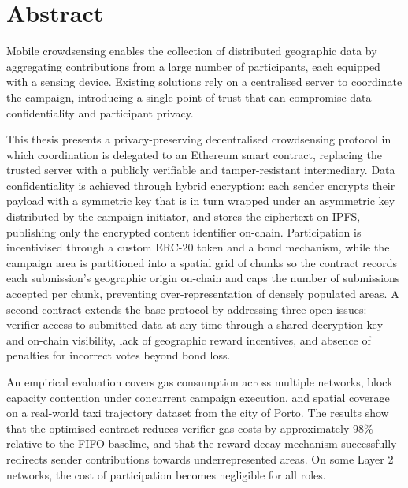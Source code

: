 \chapter*{Abstract}
Mobile crowdsensing enables the collection of distributed geographic data
by aggregating contributions from a large number of participants, each
equipped with a sensing device.
Existing solutions rely on a centralised server to coordinate the campaign,
introducing a single point of trust that can compromise data confidentiality
and participant privacy.

This thesis presents a privacy-preserving decentralised crowdsensing protocol
in which coordination is delegated to an Ethereum smart contract, replacing
the trusted server with a publicly verifiable and tamper-resistant intermediary.
Data confidentiality is achieved through hybrid encryption: each sender
encrypts their payload with a symmetric key that is in turn wrapped under an asymmetric key distributed by the campaign initiator,
and stores the ciphertext on IPFS, publishing only the encrypted
content identifier on-chain.
Participation is incentivised through a custom ERC-20 token and a bond
mechanism, while the campaign area is partitioned into a spatial grid of
chunks so the contract records each submission's geographic origin on-chain and caps the number of submissions accepted per chunk, preventing over-representation of densely populated areas.
A second contract extends the base protocol by addressing three open issues:
verifier access to submitted data at any time through a shared decryption key and on-chain visibility, lack of geographic reward incentives, and absence of penalties for incorrect votes beyond bond loss.

An empirical evaluation covers gas consumption across multiple networks,
block capacity contention under concurrent campaign execution, and spatial
coverage on a real-world taxi trajectory dataset from the city of Porto.
The results show that the optimised contract reduces verifier gas costs by
approximately $98\%$ relative to the FIFO baseline, and that the reward
decay mechanism successfully redirects sender contributions towards
underrepresented areas.
On some Layer 2 networks, the cost of participation becomes negligible for all
roles.

\topmargin=-1cm